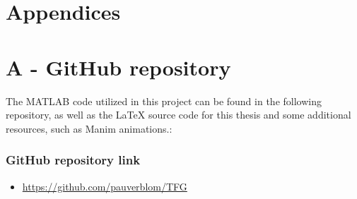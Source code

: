 \chapter*{\LARGE \textbf{Appendices}}
\fancyhf{} %
\renewcommand{\headrulewidth}{0pt} %
\fancyfoot[C]{\thepage} %

\appendix


\chapter*{A - GitHub repository}

The MATLAB code utilized in this project can be found in the following repository, as well as the LaTeX source code for this thesis and some additional resources, such as Manim animations.:

\subsection*{GitHub repository link}
\begin{itemize}
    \item \url{https://github.com/pauverblom/TFG}
\end{itemize}



